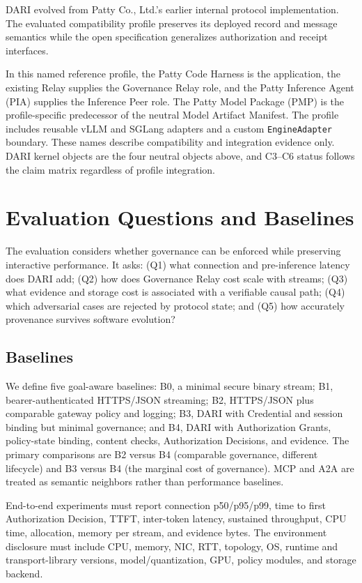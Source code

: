\documentclass[10pt]{article}
\begin{document}
DARI evolved from Patty Co., Ltd.'s earlier internal protocol implementation. The evaluated compatibility profile preserves its deployed record and message semantics while the open specification generalizes authorization and receipt interfaces.

In this named reference profile, the Patty Code Harness is the application, the existing Relay supplies the Governance Relay role, and the Patty Inference Agent (PIA) supplies the Inference Peer role. The Patty Model Package (PMP) is the profile-specific predecessor of the neutral Model Artifact Manifest. The profile includes reusable vLLM and SGLang adapters and a custom \texttt{EngineAdapter} boundary. These names describe compatibility and integration evidence only. DARI kernel objects are the four neutral objects above, and C3--C6 status follows the claim matrix regardless of profile integration.

\section{Evaluation Questions and Baselines}

The evaluation considers whether governance can be enforced while preserving interactive performance. It asks: (Q1) what connection and pre-inference latency does DARI add; (Q2) how does Governance Relay cost scale with streams; (Q3) what evidence and storage cost is associated with a verifiable causal path; (Q4) which adversarial cases are rejected by protocol state; and (Q5) how accurately provenance survives software evolution?

\subsection{Baselines}

We define five goal-aware baselines: B0, a minimal secure binary stream; B1, bearer-authenticated HTTPS/JSON streaming; B2, HTTPS/JSON plus comparable gateway policy and logging; B3, DARI with Credential and session binding but minimal governance; and B4, DARI with Authorization Grants, policy-state binding, content checks, Authorization Decisions, and evidence. The primary comparisons are B2 versus B4 (comparable governance, different lifecycle) and B3 versus B4 (the marginal cost of governance). MCP and A2A are treated as semantic neighbors rather than performance baselines.

End-to-end experiments must report connection p50/p95/p99, time to first Authorization Decision, TTFT, inter-token latency, sustained throughput, CPU time, allocation, memory per stream, and evidence bytes. The environment disclosure must include CPU, memory, NIC, RTT, topology, OS, runtime and transport-library versions, model/quantization, GPU, policy modules, and storage backend.
\end{document}
